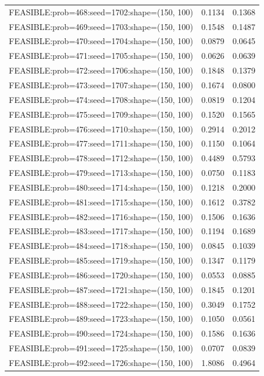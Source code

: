 \begin{longtable}{lcc}
FEASIBLE:prob=468:seed=1702:shape=(150, 100) &   0.1134 & 0.1368 \\
FEASIBLE:prob=469:seed=1703:shape=(150, 100) &   0.1548 & 0.1487 \\
FEASIBLE:prob=470:seed=1704:shape=(150, 100) &   0.0879 & 0.0645 \\
FEASIBLE:prob=471:seed=1705:shape=(150, 100) &   0.0626 & 0.0639 \\
FEASIBLE:prob=472:seed=1706:shape=(150, 100) &   0.1848 & 0.1379 \\
FEASIBLE:prob=473:seed=1707:shape=(150, 100) &   0.1674 & 0.0800 \\
FEASIBLE:prob=474:seed=1708:shape=(150, 100) &   0.0819 & 0.1204 \\
FEASIBLE:prob=475:seed=1709:shape=(150, 100) &   0.1520 & 0.1565 \\
FEASIBLE:prob=476:seed=1710:shape=(150, 100) &   0.2914 & 0.2012 \\
FEASIBLE:prob=477:seed=1711:shape=(150, 100) &   0.1150 & 0.1064 \\
FEASIBLE:prob=478:seed=1712:shape=(150, 100) &   0.4489 & 0.5793 \\
FEASIBLE:prob=479:seed=1713:shape=(150, 100) &   0.0750 & 0.1183 \\
FEASIBLE:prob=480:seed=1714:shape=(150, 100) &   0.1218 & 0.2000 \\
FEASIBLE:prob=481:seed=1715:shape=(150, 100) &   0.1612 & 0.3782 \\
FEASIBLE:prob=482:seed=1716:shape=(150, 100) &   0.1506 & 0.1636 \\
FEASIBLE:prob=483:seed=1717:shape=(150, 100) &   0.1194 & 0.1689 \\
FEASIBLE:prob=484:seed=1718:shape=(150, 100) &   0.0845 & 0.1039 \\
FEASIBLE:prob=485:seed=1719:shape=(150, 100) &   0.1347 & 0.1179 \\
FEASIBLE:prob=486:seed=1720:shape=(150, 100) &   0.0553 & 0.0885 \\
FEASIBLE:prob=487:seed=1721:shape=(150, 100) &   0.1845 & 0.1201 \\
FEASIBLE:prob=488:seed=1722:shape=(150, 100) &   0.3049 & 0.1752 \\
FEASIBLE:prob=489:seed=1723:shape=(150, 100) &   0.1050 & 0.0561 \\
FEASIBLE:prob=490:seed=1724:shape=(150, 100) &   0.1586 & 0.1636 \\
FEASIBLE:prob=491:seed=1725:shape=(150, 100) &   0.0707 & 0.0839 \\
FEASIBLE:prob=492:seed=1726:shape=(150, 100) &   1.8086 & 0.4964 \\

\end{longtable}
